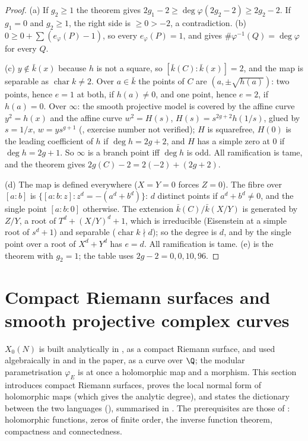 \begin{proof}
(a) If $g_2\ge1$ the theorem gives $2g_1-2\ge\deg\varphi(2g_2-2)\ge2g_2-2$. If $g_1=0$ and $g_2\ge1$, the right side is $\ge0>-2$, a contradiction.
(b) $0\ge0+\sum(e_\varphi(P)-1)$, so every $e_\varphi(P)=1$, and  gives $\#\varphi^{-1}(Q)=\deg\varphi$ for every $Q$.

(c) $y\notin\bar k(x)$ because $h$ is not a square, so $[\bar k(C):\bar k(x)]=2$, and the map is separable as $\operatorname{char}k\ne2$. Over $a\in\bar k$ the points of $C$ are
$(a,\pm\sqrt{h(a)})$: two points, hence $e=1$ at both, if $h(a)\ne0$, and one point, hence $e=2$, if $h(a)=0$. Over $\infty$: the smooth projective model is
covered by the affine curve $y^2=h(x)$ and the affine curve $w^2=H(s)$, $H(s)=s^{2g+2}h(1/s)$, glued by $s=1/x$, $w=ys^{g+1}$ (\cite[Chapter II,
Exercise 2.14]{SilvermanAEC}, exercise number not verified); $H$ is squarefree, $H(0)$ is the leading coefficient of $h$ if $\deg h=2g+2$, and $H$ has a simple
zero at $0$ if $\deg h=2g+1$. So $\infty$ is a branch point iff $\deg h$ is odd. All ramification is tame, and the theorem gives $2g(C)-2=2(-2)+(2g+2)$.

(d) The map is defined everywhere ($X=Y=0$ forces $Z=0$). The fibre over $[a:b]$ is $\{[a:b:z]:z^d=-(a^d+b^d)\}$: $d$ distinct points if $a^d+b^d\ne0$, and the
single point $[a:b:0]$ otherwise. The extension $\bar k(C)/\bar k(X/Y)$ is generated by $Z/Y$, a root of $T^d+(X/Y)^d+1$, which is irreducible (Eisenstein at a
simple root of $s^d+1$) and separable ($\operatorname{char}k\nmid d$); so the degree is $d$, and by  the single point over a root of $X^d+Y^d$
has $e=d$. All ramification is tame. (e) is the theorem with $g_2=1$; the table uses $2g-2=0,0,10,96$.
\end{proof}

\section[Compact Riemann surfaces and complex curves]{Compact Riemann surfaces and smooth projective complex curves}\label{sec:curves:riemann-surfaces}

$X_0(N)$ is built analytically in , as a compact Riemann surface, and used algebraically in  and in the paper, as a curve
over $\Q$; the modular parametrisation $\varphi_E$ is at once a holomorphic map and a morphism. This section introduces compact Riemann surfaces, proves the local
normal form of holomorphic maps (which gives the analytic degree), and states the dictionary between the two languages (),
summarised in . The prerequisites are those of : holomorphic functions, zeros of finite order, the inverse function
theorem, compactness and connectedness.


